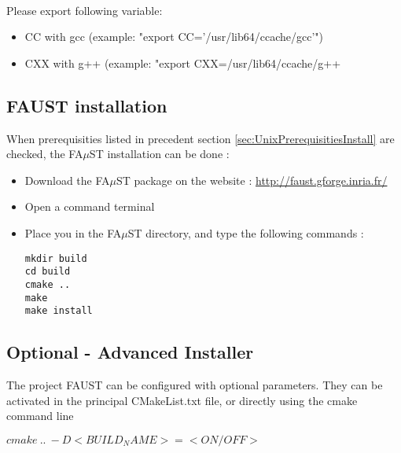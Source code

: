 \paragraph{}Please export following variable:
\begin{itemize}
\item CC with gcc (example: "export CC='/usr/lib64/ccache/gcc'") 
\item CXX with g++ (example: "export CXX=/usr/lib64/ccache/g++
\end{itemize}


\subsection{FAUST installation}\label{sec:UnixFaustInstall}
When prerequisities listed in precedent section \ref{sec:UnixPrerequisitiesInstall} are checked, the FA$\mu$ST installation can be done : 

\begin{itemize}
\item Download the FA$\mu$ST package on the website :  \url{http://faust.gforge.inria.fr/}
\item Open a command terminal
\item Place you in the FA$\mu$ST directory, and type the following commands : 
\begin{lstlisting}
mkdir build
cd build
cmake ..
make
make install
\end{lstlisting}
\end{itemize}

\subsection{Optional - Advanced Installer}\label{sec:UnixOptionalInstall}

The project FAUST can be configured with optional parameters. They can be activated in the principal CMakeList.txt file, or directly using the cmake command line

$cmake\ ..\ -D<BUILD_NAME>=<ON/OFF>$

